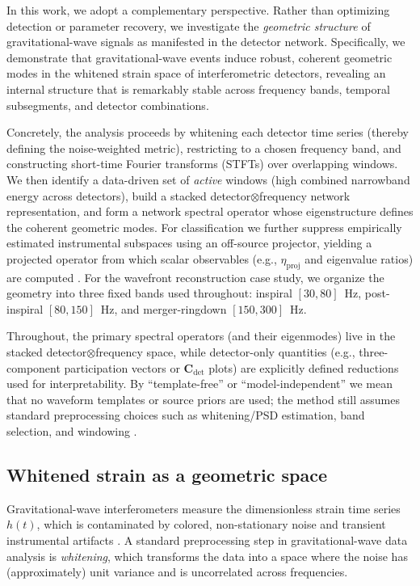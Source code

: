\documentclass[11pt,a4paper]{article}
\begin{document}
In this work, we adopt a complementary perspective. Rather than optimizing detection or parameter recovery, we investigate the \emph{geometric structure} of gravitational-wave signals as manifested in the detector network. Specifically, we demonstrate that gravitational-wave events induce robust, coherent geometric modes in the whitened strain space of interferometric detectors, revealing an internal structure that is remarkably stable across frequency bands, temporal subsegments, and detector combinations.

Concretely, the analysis proceeds by whitening each detector time series (thereby defining the noise-weighted metric), restricting to a chosen frequency band, and constructing short-time Fourier transforms (STFTs) over overlapping windows.
We then identify a data-driven set of \emph{active} windows (high combined narrowband energy across detectors), build a stacked detector$\otimes$frequency network representation, and form a network spectral operator whose eigenstructure defines the coherent geometric modes.
For classification we further suppress empirically estimated instrumental subspaces using an off-source projector, yielding a projected operator from which scalar observables (e.g., $\eta_{\mathrm{proj}}$ and eigenvalue ratios) are computed \cite{Acernese2023VirgoDetCharTools}.
For the wavefront reconstruction case study, we organize the geometry into three fixed bands used throughout: inspiral $[30,80]$~Hz, post-inspiral $[80,150]$~Hz, and merger-ringdown $[150,300]$~Hz.

Throughout, the primary spectral operators (and their eigenmodes) live in the stacked detector$\otimes$frequency space, while detector-only quantities (e.g., three-component participation vectors or $\mathbf{C}_{\mathrm{det}}$ plots) are explicitly defined reductions used for interpretability.
By “template-free” or “model-independent” we mean that no waveform templates or source priors are used; the method still assumes standard preprocessing choices such as whitening/PSD estimation, band selection, and windowing \cite{Creighton2011, Usman2016, Acernese2023VirgoDetCharTools}.

\subsection{Whitened strain as a geometric space}
\label{sec:whitened_strain_space}

Gravitational-wave interferometers measure the dimensionless strain time series $h(t)$, which is contaminated by colored, non-stationary noise and transient instrumental artifacts \cite{Acernese2023VirgoDetCharTools, Tolley2023ArchEnemy}. A standard preprocessing step in gravitational-wave data analysis is \emph{whitening}, which transforms the data into a space where the noise has (approximately) unit variance and is uncorrelated across frequencies.
\end{document}
